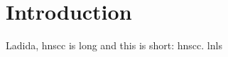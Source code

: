 \documentclass[../ms.tex]{subfiles}
\begin{document}
\chapter{Introduction}
\label{chap:introduction}

Ladida, \gls{hnscc} is long and this is short: \gls{hnscc}. \glspl{lnl}
\end{document}
